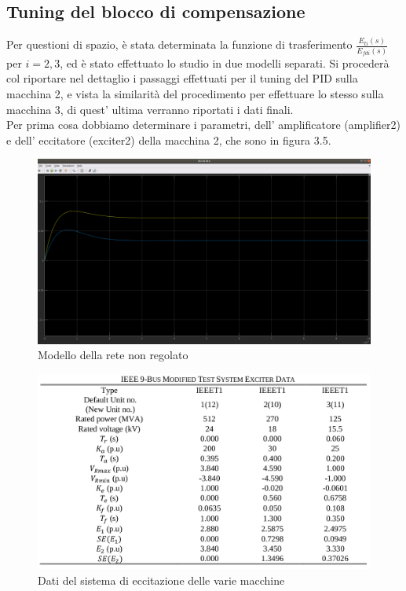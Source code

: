 \documentclass[Lau,noexaminfo]{sapthesis}
\begin{document}
	\subsection{Tuning del blocco di compensazione}
	Per questioni di spazio, è stata determinata la funzione di trasferimento $\frac{E_{ti}(s)}{E_{fdi}(s)}$ per $i=2,3$, ed è stato effettuato lo studio in due modelli separati. Si procederà col riportare nel dettaglio i passaggi effettuati per il tuning del PID sulla macchina 2, e vista la similarità del procedimento per effettuare lo stesso sulla macchina 3, di quest' ultima verranno riportati i dati finali.\\
	Per prima cosa dobbiamo determinare i parametri, dell' amplificatore (amplifier2) e dell' eccitatore (exciter2) della macchina 2, che sono in figura 3.5.
	\begin{figure}
	\centering
	\includegraphics[height=0.4\textheight]{Uscita_non_regolata}
	\caption{Modello della rete non regolato}
	\end{figure}	
	\begin{figure}
	 	\centering
	 	\includegraphics[height=0.3\textheight]{Dati_Sistema_Eccitazione}	 	\caption{Dati del sistema di eccitazione delle varie macchine}
	\end{figure}
\end{document}

